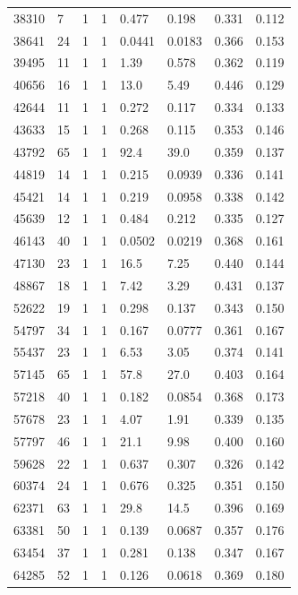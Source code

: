 \documentclass[preview]{standalone}
\begin{document}
{{{{{{{{{{{{{{\begin{tabular}{L{1.2cm}C{1.2cm} C{0.3cm}C{0.5cm} C{1.4cm}C{1.4cm} C{1.4cm}C{1.4cm}}
  38310  &     7  & 1     &  1 &  0.477  & 0.198  & 0.331 &  0.112   \\ 
  38641  &    24  & 1     &  1 &  0.0441  & 0.0183  & 0.366 &  0.153   \\ 
  39495  &    11  & 1     &  1 &  1.39  & 0.578  & 0.362 &  0.119   \\ 
  40656  &    16  & 1     &  1 &  13.0  & 5.49  & 0.446 &  0.129   \\ 
  42644  &    11  & 1     &  1 &  0.272  & 0.117  & 0.334 &  0.133   \\ 
  43633  &    15  & 1     &  1 &  0.268  & 0.115  & 0.353 &  0.146   \\ 
  43792  &    65  & 1     &  1 &  92.4  & 39.0  & 0.359 &  0.137   \\ 
  44819  &    14  & 1     &  1 &  0.215  & 0.0939  & 0.336 &  0.141   \\ 
  45421  &    14  & 1     &  1 &  0.219  & 0.0958  & 0.338 &  0.142   \\ 
  45639  &    12  & 1     &  1 &  0.484  & 0.212  & 0.335 &  0.127   \\ 
  46143  &    40  & 1     &  1 &  0.0502  & 0.0219  & 0.368 &  0.161   \\ 
  47130  &    23  & 1     &  1 &  16.5  & 7.25  & 0.440 &  0.144   \\ 
  48867  &    18  & 1     &  1 &  7.42  & 3.29  & 0.431 &  0.137   \\ 
  52622  &    19  & 1     &  1 &  0.298  & 0.137  & 0.343 &  0.150   \\ 
  54797  &    34  & 1     &  1 &  0.167  & 0.0777  & 0.361 &  0.167   \\ 
  55437  &    23  & 1     &  1 &  6.53  & 3.05  & 0.374 &  0.141   \\ 
  57145  &    65  & 1     &  1 &  57.8  & 27.0  & 0.403 &  0.164   \\ 
  57218  &    40  & 1     &  1 &  0.182  & 0.0854  & 0.368 &  0.173   \\ 
  57678  &    23  & 1     &  1 &  4.07  & 1.91  & 0.339 &  0.135   \\ 
  57797  &    46  & 1     &  1 &  21.1  & 9.98  & 0.400 &  0.160   \\ 
  59628  &    22  & 1     &  1 &  0.637  & 0.307  & 0.326 &  0.142   \\ 
  60374  &    24  & 1     &  1 &  0.676  & 0.325  & 0.351 &  0.150   \\ 
  62371  &    63  & 1     &  1 &  29.8  & 14.5  & 0.396 &  0.169   \\ 
  63381  &    50  & 1     &  1 &  0.139  & 0.0687  & 0.357 &  0.176   \\ 
  63454  &    37  & 1     &  1 &  0.281  & 0.138  & 0.347 &  0.167   \\ 
  64285  &    52  & 1     &  1 &  0.126  & 0.0618  & 0.369 &  0.180   \\ 
\hline 
\end{tabular} 

}}}}}}}}}}}}}}
\end{document}
